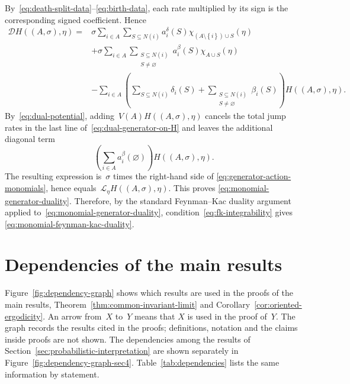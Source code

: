 \documentclass[EJP,preprint,NODS,nobera]{ejpecp}
\newcommand{\bb}[1]{\left(#1\right)}
\newcommand{\cb}[1]{\left\{#1\right\}}
\newcommand{\Lcal}{\mathcal{L}}
\newcommand{\Dcal}{\mathcal{D}}
\newcommand{\chg}[1]{{\color{changegreen}#1}}
\begin{document}
By~\eqref{eq:death-split-data}--\eqref{eq:birth-data}, each rate multiplied by
its sign is the corresponding signed coefficient. Hence
\begin{equation}
\label{eq:dual-generator-on-H}
\begin{aligned}
\Dcal H((A,\sigma),\eta)
={}&
\sigma
\sum_{i\in A}\sum_{S\subseteq N(i)}
a_i^\delta(S)
\chi_{\bb{A\setminus\cb{i}}\cup S}(\eta)
\\
&+
\sigma
\sum_{i\in A}
\sum_{\substack{S\subseteq N(i)\\S\neq\varnothing}}
a_i^\beta(S)
\chi_{A\cup S}(\eta)
\\
&-
\sum_{i\in A}
\bb{
\sum_{S\subseteq N(i)}\delta_i(S)
+
\sum_{\substack{S\subseteq N(i)\\S\neq\varnothing}}\beta_i(S)
}H((A,\sigma),\eta).
\end{aligned}
\end{equation}
By~\eqref{eq:dual-potential}, adding~$V(A)H((A,\sigma),\eta)$ cancels the
total jump rates in the last line of~\eqref{eq:dual-generator-on-H} and leaves
the additional diagonal term
\begin{equation*}
\bb{\sum_{i\in A}a_i^\beta(\varnothing)}H((A,\sigma),\eta).
\end{equation*}
The resulting expression is~$\sigma$ times the right-hand side of
\eqref{eq:generator-action-monomials}, hence equals~$\Lcal_\eta H((A,\sigma),\eta)$. This proves
\eqref{eq:monomial-generator-duality}. Therefore, by the standard Feynman--Kac duality argument applied to~\eqref{eq:monomial-generator-duality}, condition~\eqref{eq:fk-integrability} gives
\eqref{eq:monomial-feynman-kac-duality}.
\fi

\section{Dependencies of the main results}
\label{app:dependencies}

Figure~\ref{fig:dependency-graph} shows which results are used in the proofs
of the main results, Theorem~\ref{thm:common-invariant-limit} and
Corollary~\ref{cor:oriented-ergodicity}. An arrow from~$X$ to~$Y$ means that
$X$ is used in the proof of~$Y$. The graph records the results cited in the
proofs; definitions, notation and the claims inside proofs are not shown.
\chg{The dependencies among the results of
Section~\ref{sec:probabilistic-interpretation} are shown separately in
Figure~\ref{fig:dependency-graph-sec4}.}
Table~\ref{tab:dependencies} lists the same information by statement.
\end{document}
